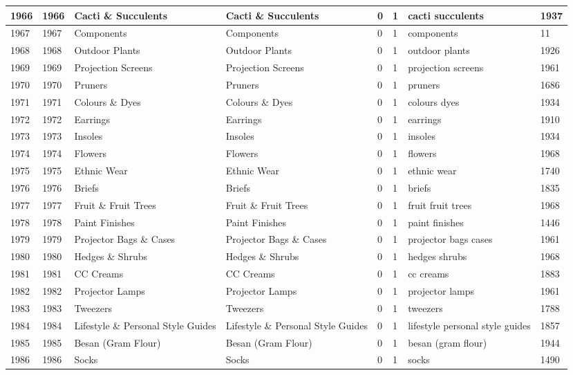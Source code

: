 \begin{longtable}{|l|l|l|l|l|l|l|l|}
1966 & 1966 & Cacti \& Succulents & Cacti \& Succulents & 0 & 1 & cacti succulents & 1937 \\ \hline 
1967 & 1967 & Components & Components & 0 & 1 & components & 11 \\ \hline 
1968 & 1968 & Outdoor Plants & Outdoor Plants & 0 & 1 & outdoor plants & 1926 \\ \hline 
1969 & 1969 & Projection Screens & Projection Screens & 0 & 1 & projection screens & 1961 \\ \hline 
1970 & 1970 & Pruners & Pruners & 0 & 1 & pruners & 1686 \\ \hline 
1971 & 1971 & Colours \& Dyes & Colours \& Dyes & 0 & 1 & colours dyes & 1934 \\ \hline 
1972 & 1972 & Earrings & Earrings & 0 & 1 & earrings & 1910 \\ \hline 
1973 & 1973 & Insoles & Insoles & 0 & 1 & insoles & 1934 \\ \hline 
1974 & 1974 & Flowers & Flowers & 0 & 1 & flowers & 1968 \\ \hline 
1975 & 1975 & Ethnic Wear & Ethnic Wear & 0 & 1 & ethnic wear & 1740 \\ \hline 
1976 & 1976 & Briefs & Briefs & 0 & 1 & briefs & 1835 \\ \hline 
1977 & 1977 & Fruit \& Fruit Trees & Fruit \& Fruit Trees & 0 & 1 & fruit fruit trees & 1968 \\ \hline 
1978 & 1978 & Paint Finishes & Paint Finishes & 0 & 1 & paint finishes & 1446 \\ \hline 
1979 & 1979 & Projector Bags \& Cases & Projector Bags \& Cases & 0 & 1 & projector bags cases & 1961 \\ \hline 
1980 & 1980 & Hedges \& Shrubs & Hedges \& Shrubs & 0 & 1 & hedges shrubs & 1968 \\ \hline 
1981 & 1981 & CC Creams & CC Creams & 0 & 1 & cc creams & 1883 \\ \hline 
1982 & 1982 & Projector Lamps & Projector Lamps & 0 & 1 & projector lamps & 1961 \\ \hline 
1983 & 1983 & Tweezers & Tweezers & 0 & 1 & tweezers & 1788 \\ \hline 
1984 & 1984 & Lifestyle \& Personal Style Guides & Lifestyle \& Personal Style Guides & 0 & 1 & lifestyle personal style guides & 1857 \\ \hline 
1985 & 1985 & Besan (Gram Flour) & Besan (Gram Flour) & 0 & 1 & besan (gram flour) & 1944 \\ \hline 
1986 & 1986 & Socks & Socks & 0 & 1 & socks & 1490 \\ \hline 

\end{longtable}
